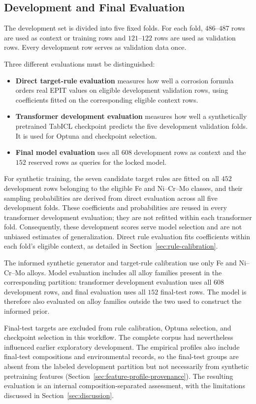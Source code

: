 \documentclass{article}
\begin{document}
\subsection{Development and Final Evaluation}

The development set is divided into five fixed folds. For each fold,
\(486\)--\(487\) rows are used as context or training rows and
\(121\)--\(122\) rows are used as validation rows. Every development row
serves as validation data once.

Three different evaluations must be distinguished:
\begin{itemize}
    \item \textbf{Direct target-rule evaluation} measures how well a corrosion
    formula orders real EPIT values on eligible development validation rows,
    using coefficients fitted on the corresponding eligible context rows.
    \item \textbf{Transformer development evaluation} measures how well a
    synthetically pretrained TabICL checkpoint predicts the five development
    validation folds. It is used for Optuna and checkpoint selection.
    \item \textbf{Final model evaluation} uses all \(608\) development rows
    as context and the \(152\) reserved rows as queries for the locked model.
\end{itemize}

For synthetic training, the seven candidate target rules are fitted on all
\(452\) development rows belonging to the eligible Fe and Ni--Cr--Mo classes,
and their sampling probabilities are derived from direct evaluation across
all five development folds. These coefficients and probabilities are reused
in every transformer development evaluation; they are not refitted within
each transformer fold. Consequently, these development scores serve model
selection and are not unbiased estimates of generalization. Direct rule
evaluation fits coefficients within each fold's eligible context, as detailed
in Section~\ref{sec:rule-calibration}.

The informed synthetic generator and target-rule calibration use only Fe and
Ni--Cr--Mo alloys. Model evaluation includes all alloy families present in
the corresponding partition: transformer development evaluation uses all
\(608\) development rows, and final evaluation uses all \(152\) final-test
rows. The model is therefore also evaluated on alloy families outside the
two used to construct the informed prior.

Final-test targets are excluded from rule calibration, Optuna selection, and
checkpoint selection in this workflow. The complete corpus had nevertheless
influenced earlier exploratory development. The empirical profiles also
include final-test compositions and environmental records, so the final-test
groups are absent from the labeled development partition but not necessarily
from synthetic pretraining features
(Section~\ref{sec:feature-profile-provenance}). The resulting evaluation is an
internal composition-separated assessment, with the limitations discussed in
Section~\ref{sec:discussion}.
\end{document}
